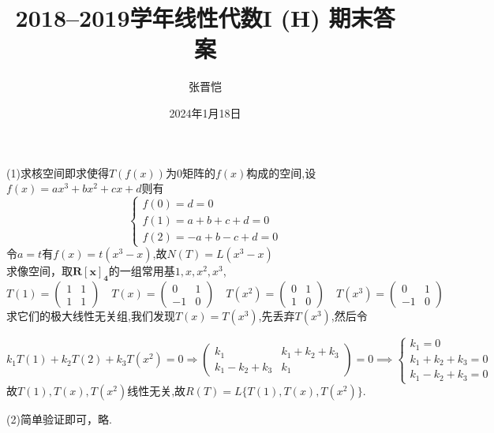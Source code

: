 \documentclass[UTF8]{article}
\title{2018--2019学年线性代数I (H) 期末答案 }
\author{张晋恺}
\date{2024年1月18日}
\begin{document}
\maketitle
{}
(1)求核空间即求使得$T(f(x))$为0矩阵的$f(x)$构成的空间,设$f(x)=ax^3+bx^2+cx+d$则有
\begin{equation*}\begin{cases}f(0)=d=0\\f(1)=a+b+c+d=0\\f(2)=-a+b-c+d=0\end{cases}\end{equation*}
令$a=t$有$f(x)=t(x^3-x)$,故$N(T)=L(x^3-x)$\\
求像空间，取$\mathbf{R[x]_4}$的一组常用基$1,x,x^2,x^3$,
\begin{equation*}
T(1)=\left(\begin{matrix}
    1&1\\1&1
\end{matrix}\right)\quad
T(x)=\left(\begin{matrix}
    0&1\\-1&0
\end{matrix}\right)\quad
T(x^2)=\left(\begin{matrix}
    0&1\\1&0
\end{matrix}\right)\quad
T(x^3)=\left(\begin{matrix}
    0&1\\-1&0
\end{matrix}\right)
\end{equation*} 
求它们的极大线性无关组,我们发现$T(x)=T(x^3)$,先丢弃$T(x^3)$,然后令

\begin{equation*}
    k_1T(1)+k_2T(2)+k_3T(x^2)=0\Rightarrow
    \left(\begin{matrix}
        k_1&k_1+k_2+k_3\\k_1-k_2+k_3&k_1
    \end{matrix}\right)=0
    \implies
    \begin{cases}k_1=0\\k_1+k_2+k_3=0\\k_1-k_2+k_3=0\end{cases}   
\end{equation*}
故$T(1),T(x),T(x^2)$线性无关,故$R(T)=L\{T(1),T(x),T(x^2)\}$.\par
(2)简单验证即可，略.
\par
\end{document}
